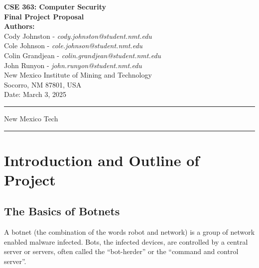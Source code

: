 \documentclass[english,12pt]{article}
\begin{document}
\begin{titlepage}
    \null
    \vspace*{2cm}
    
    \begin{center}
        {\Huge \bfseries CSE 363: Computer Security}\\[1.5cm]
        {\Large \bfseries Final Project Proposal}\\[2cm]
        
        \textbf{Authors:} \\[0.5cm]
        Cody Johnston - \textit{cody.johnston@student.nmt.edu}\\
        Cole Johnson - \textit{cole.johnson@student.nmt.edu}\\
        Colin Grandjean - \textit{colin.grandjean@student.nmt.edu}\\
        John Runyon - \textit{john.runyon@student.nmt.edu}\\
        
        New Mexico Institute of Mining and Technology\\
        Socorro, NM 87801, USA\\[2cm]
        
        {\large Date: March 3, 2025}
    \end{center}
    
    \vfill
    \hrule
    \smallskip
    \centerline{\sc New Mexico Tech}
    \smallskip
    \hrule
\end{titlepage}
\frenchspacing
\pagebreak
\section*{Introduction and Outline of Project}
\subsection*{The Basics of Botnets}
A botnet (the combination of the words robot and network) is a group of network 
enabled malware infected. Bots, the infected devices, 
are controlled by a central server or servers, 
often called the “bot-herder” or the “command and control server”. 
\end{document}
